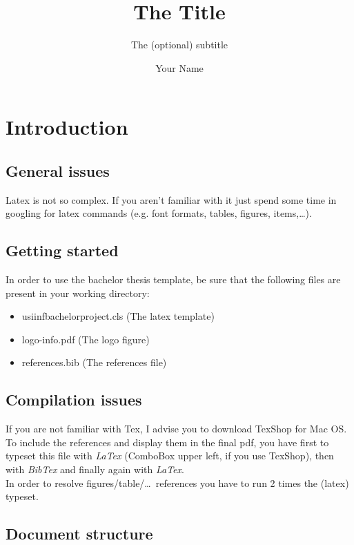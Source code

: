 \documentclass[]{usiinfbachelorproject}
\author{Your Name}
\title{The Title}
\subtitle{The (optional) subtitle}
\begin{document}
\maketitle

\section{Introduction} \label{introduction}

\subsection{General issues}

Latex is not so complex. If you aren't familiar with it just spend some time in googling for latex commands (e.g. font formats, tables, figures, items,\dots).

\subsection{Getting started}
In order to use the bachelor thesis template, be sure that the following files are present in your working directory:
\begin{itemize}
\item usiinfbachelorproject.cls (The latex template)
\item logo-info.pdf (The logo figure)
\item references.bib (The references file)\\
\end{itemize}

\subsection {Compilation issues}

If you are not familiar with Tex, I advise you to download TexShop for Mac OS.\\
To include the references and display them in the final pdf, you have first to typeset this file with \textit{LaTex} (ComboBox upper left, if you use TexShop), then with \textit{BibTex} and finally again with \textit{LaTex}.\\
In order to resolve figures/table/\dots~references you have to run 2 times the (latex) typeset.

\subsection {Document structure}
\end{document}
